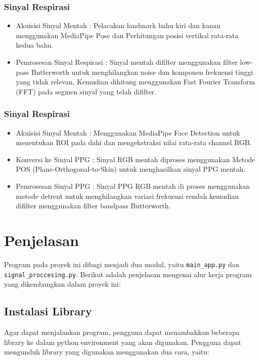 \documentclass[11pt,a4paper]{article}
\begin{document}
\subsubsection{Sinyal Respirasi}
\begin{itemize}
    \item Akuisisi Sinyal Mentah : Pelacakan landmark bahu kiri dan kanan menggunakan MediaPipe Pose dan Perhitungan posisi vertikal rata-rata kedua bahu.
    \item Pemrosesan Sinyal Respirasi : Sinyal mentah difilter menggunakan filter low-pass Butterworth untuk menghilangkan noise dan komponen frekuensi tinggi yang tidak relevan, Kemudian dihitung menggunakan Fast Fourier Transform (FFT) pada segmen sinyal yang telah difilter.
\end{itemize}

\subsubsection{Sinyal Respirasi}
\begin{itemize}
    \item Akuisisi Sinyal Mentah : Menggunakan MediaPipe Face Detection untuk menentukan ROI pada dahi dan mengekstraksi nilai rata-rata channel RGB.
    \item Konversi ke Sinyal PPG : Sinyal RGB mentah diproses menggunakan Metode POS (Plane-Orthogonal-to-Skin) untuk menghasilkan sinyal PPG mentah.
    \item Pemrosesan Sinyal PPG : Sinyal PPG RGB mentah di proses menggunakan metode detrent untuk menghilangkan variasi frekuensi rendah kemudian difilter menggunakan filter bandpass Butterworth.
\end{itemize}
     

\section{Penjelasan}
    Program pada proyek ini dibagi menjadi dua modul, yaitu \texttt{main\_app.py} dan \texttt{signal\_proccesing.py}. Berikut adalah penjelasan mengenai alur kerja program yang dikembangkan dalam proyek ini:

\subsection{Instalasi Library}
     Agar dapat menjalankan program, pengguna dapat menambahkan beberapa library ke dalam python environment yang akan digunakan. Pengguna dapat mengunduh library yang digunakan menggunakan dua cara, yaitu:
\end{document}
